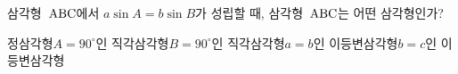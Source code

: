 삼각형~$\mathrm{ABC}$에서 $a\sin A=b\sin B$가 성립할 때, 삼각형~$\mathrm{ABC}$는 어떤 삼각형인가?
\begin{choicesii}{정삼각형}{$A=90^\circ$인 직각삼각형}{$B=90^\circ$인 직각삼각형}{$a=b$인 이등변삼각형}{$b=c$인 이등변삼각형}\end{choicesii}
